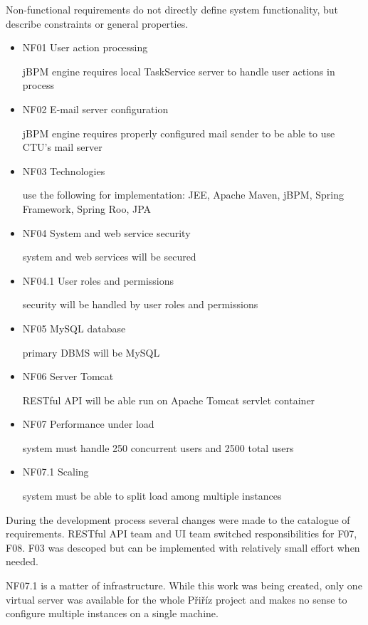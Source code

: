 	Non-functional requirements do not directly define system functionality, but describe constraints or general
	properties.
	
	\begin{itemize}
		\item NF01 User action processing
	
		jBPM engine requires local TaskService server to handle user actions in process
		
		\item NF02 E-mail server configuration

		jBPM engine requires properly configured mail sender to be able to use CTU's mail server
		
		\item NF03 Technologies
		
		use the following for implementation: JEE, Apache Maven, jBPM, Spring Framework, Spring Roo, JPA
		
		\item NF04 System and web service security
		
		system and web services will be secured
		
		\item NF04.1 User roles and permissions
		
		security will be handled by user roles and permissions
		
		\item NF05 MySQL database
		
		primary DBMS will be MySQL
		
		\item NF06 Server Tomcat
		
		RESTful API will be able run on Apache Tomcat servlet container
		
		\item NF07 Performance under load
		
		system must handle 250 concurrent users and 2500 total users
		
		\item NF07.1 Scaling
		
		system must be able to split load among multiple instances
	\end{itemize}
	
	During the development process several changes were made to the catalogue of requirements. RESTful API team and UI team
	switched responsibilities for  F07, F08. F03 was descoped but can be implemented with relatively small effort when
	needed.
	
	NF07.1 is a matter of infrastructure. While this work was being created, only one virtual server was available for the
	whole Přiříz project and makes no sense to configure multiple instances on a single machine.
	
